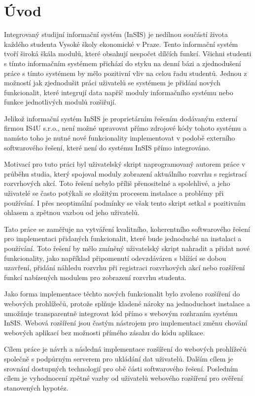 \chapter*{Úvod}

Integrovaný studijní informační systém (InSIS) je nedílnou součástí života každého studenta Vysoké školy ekonomické v Praze. Tento informační systém tvoří široká škála modulů, které obsahují nespočet dílčích funkcí. Všichni studenti s tímto informačním systémem přichází do styku na denní bázi a zjednodušení práce s tímto systémem by mělo pozitivní vliv na celou řadu studentů. Jednou z možností jak zjednodušit práci uživatelů se systémem je přidání nových funkcionalit, které integrují data napříč moduly informačního systému nebo funkce jednotlivých modulů rozšiřují. 

Jelikož informační systém InSIS je proprietárním řešením dodávaným externí firmou IS4U s.r.o., není možné upravovat přímo zdrojové kódy tohoto systému a namísto toho je nutné nové funkcionality implementovat v podobě externího softwarového řešení, které není do systému InSIS přímo integrováno. 

Motivací pro tuto práci byl uživatelský skript naprogramovaný autorem práce v průběhu studia, který spojoval moduly zobrazení aktuálního rozvrhu s registrací rozvrhových akcí. Toto řešení nebylo příliš přenositelné a spolehlivé, a jeho uživatelé se často potýkali se složitým procesem instalace a problémy při používání. I přes neoptimální podmínky se však tento skript setkal s pozitivním ohlasem a zpětnou vazbou od jeho uživatelů.

Tato práce se zaměřuje na vytváření kvalitního, koherentního softwarového řešení pro implementaci přidaných funkcionalit, které bude jednoduché na instalaci a používání. Toto řešení by mělo zmíněný uživatelský skript nahradit a přidat nové funkcionality, jako například připomenutí odevzdáváren s blížící se dobou uzavření, přidání náhledu rozvrhu při registraci rozvrhových akcí nebo rozšíření funkcí nabízených modulem pro zobrazení rozvrhu studenta. 

Jako forma implementace těchto nových funkcionalit bylo zvoleno rozšíření do webových prohlížečů, protože splňuje kladené nároky na jednoduchost instalace a umožňuje transparentně integrovat kód přímo s webovým rozhraním systému InSIS. Webová rozšíření jsou častým nástrojem pro implementaci změnu chování webových aplikací bez možnosti přímého zásahu do kódu aplikace. 

Cílem práce je návrh a následná implementace rozšíření do webových prohlížečů společně s podpůrným serverem pro ukládání dat uživatelů. Dalším cílem je srovnání dostupných technologií pro obě části softwarového řešení. Posledním cílem je vyhodnocení zpětné vazby od uživatelů webového rozšíření pro ověření stanovených hypotéz.


